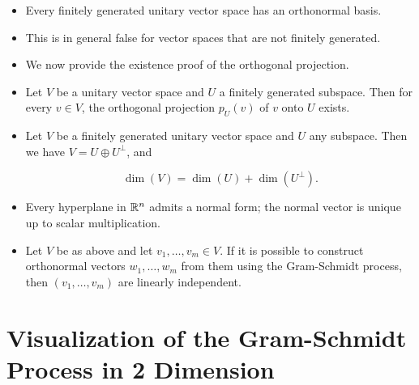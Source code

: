 \begin{itemize}

    \item Every finitely generated unitary vector space has an orthonormal basis.
    
    \item This is in general false for vector spaces that are not finitely generated.
    
    \item We now provide the existence proof of the orthogonal projection.
    
    \item Let \( V \) be a unitary vector space and \( U \) a finitely generated subspace. 
    Then for every \( v \in V \), the orthogonal projection \( p_U(v) \) of \( v \) onto \( U \) 
    exists.

    \item Let \( V \) be a finitely generated unitary vector space and \( U \) any subspace. Then we have \( V = U \oplus U^\perp \), and
      
    \[
        \dim(V) = \dim(U) + \dim(U^\perp).
    \]
    
    \item Every hyperplane in \( \mathbb{R}^n \) admits a normal form; the normal vector is 
    unique up to scalar multiplication.
    
    \item Let \( V \) be as above and let \( v_1, \ldots, v_m \in V \). If it is possible to 
    construct orthonormal vectors \( w_1, \ldots, w_m \) from them using the Gram-Schmidt process, 
    then \( (v_1, \ldots, v_m) \) are linearly independent.

\end{itemize}

\section{Visualization of the Gram-Schmidt Process in 2 Dimension}

\begin{center}
\end{center}

